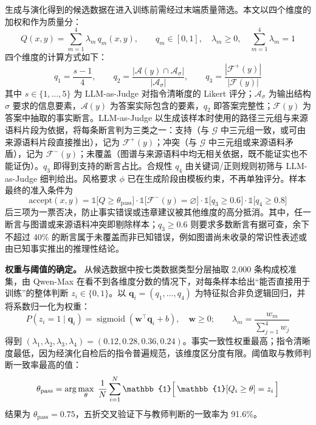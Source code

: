 \documentclass[fontset=fandol,type=master,campus=shenzhen,etitleauto=true]{hithesisbook}
\begin{document}
生成与演化得到的候选数据在进入训练前需经过末端质量筛选。本文以四个维度的加权和作为质量分：
\begin{equation}\label{eq:quality}
Q(x, y) = \sum_{m=1}^{4} \lambda_m\, q_m(x, y), \qquad q_m \in [0, 1], \quad \lambda_m \ge 0, \quad \sum_{m=1}^{4} \lambda_m = 1
\end{equation}
四个维度的计算方式如下：
\begin{equation}\label{eq:quality-dims}
q_1 = \frac{s - 1}{4}, \qquad
q_2 = \frac{|\mathcal{A}(y) \cap \mathcal{A}_\sigma|}{|\mathcal{A}_\sigma|}, \qquad
q_3 = \frac{|\mathcal{F}^{+}(y)|}{|\mathcal{F}(y)|}
\end{equation}
其中 $s \in \{1, \ldots, 5\}$ 为 LLM-as-Judge 对指令清晰度的 Likert 评分；$\mathcal{A}_\sigma$ 为输出结构 $\sigma$ 要求的信息要素，$\mathcal{A}(y)$ 为答案实际包含的要素，$q_2$ 即答案完整性；$\mathcal{F}(y)$ 为答案中抽取的事实断言。LLM-as-Judge 以生成该样本时使用的路径三元组与来源语料片段为依据，将每条断言判为三类之一：支持（与 $\mathcal{G}$ 中三元组一致，或可由来源语料片段直接推出），记为 $\mathcal{F}^{+}(y)$；冲突（与 $\mathcal{G}$ 中三元组或来源语料矛盾），记为 $\mathcal{F}^{-}(y)$；未覆盖（图谱与来源语料中均无相关依据，既不能证实也不能证伪）。$q_3$ 即得到支持的断言占比。合规性 $q_4$ 由关键词/正则规则初筛与 LLM-as-Judge 细判给出。风格要求 $\phi$ 已在生成阶段由模板约束，不再单独评分。样本最终的准入条件为
\begin{equation}\label{eq:accept}
\text{accept}(x, y) = \mathbb{1}\bigl[Q \ge \theta_{\text{pass}}\bigr] \cdot \mathbb{1}\bigl[\mathcal{F}^{-}(y) = \varnothing\bigr] \cdot \mathbb{1}\bigl[q_3 \ge 0.6\bigr] \cdot \mathbb{1}\bigl[q_4 \ge 0.8\bigr]
\end{equation}
后三项为一票否决，防止事实错误或违章建议被其他维度的高分抵消。其中，任一断言与图谱或来源语料冲突即剔除样本；$q_3 \ge 0.6$ 则要求多数断言有据可查，余下不超过 40\% 的断言属于未覆盖而非已知错误，例如图谱尚未收录的常识性表述或由已知事实推出的推理性结论。

\textbf{权重与阈值的确定。} 从候选数据中按七类数据类型分层抽取 2,000 条构成校准集，由 Qwen-Max 在看不到各维度分数的情况下，对每条样本给出“能否直接用于训练”的整体判断 $z_i \in \{0, 1\}$。以 $\mathbf{q}_i = (q_1, \ldots, q_4)$ 为特征拟合非负逻辑回归，并将系数归一化为权重：
\begin{equation}\label{eq:weight-calib}
P(z_i = 1 \mid \mathbf{q}_i) = \operatorname{sigmoid}(\mathbf{w}^\top \mathbf{q}_i + b), \quad \mathbf{w} \ge 0; \qquad
\lambda_m = \frac{w_m}{\sum_{j=1}^{4} w_j}
\end{equation}
得到 $(\lambda_1, \lambda_2, \lambda_3, \lambda_4) = (0.12, 0.28, 0.36, 0.24)$。事实一致性权重最高；指令清晰度最低，因为经演化自检后的指令普遍规范，该维度区分度有限。阈值取与教师判断一致率最高的值：
\begin{equation}\label{eq:theta-pass}
\theta_{\text{pass}} = \arg\max_{\theta} \; \frac{1}{N} \sum_{i=1}^{N} \mathbb{1}\Bigl[\, \mathbb{1}[Q_i \ge \theta] = z_i \,\Bigr]
\end{equation}
结果为 $\theta_{\text{pass}} = 0.75$，五折交叉验证下与教师判断的一致率为 91.6\%。
\end{document}
